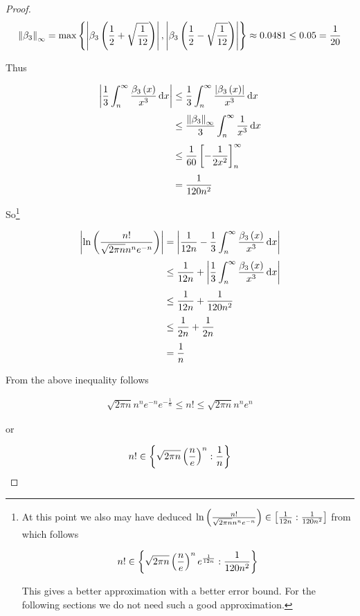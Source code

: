 \begin{proof}
  \begin{align}
    \snorm{\bps[3]} = \max\left\{\abs{\bp[3]{\frac 12 + \sqrt{\frac{1}{12}}}}, \abs{\bp[3]{\frac 12 - \sqrt{\frac{1}{12}}}}\right\} \approx 0.0481 \le 0.05 = \frac{1}{20}
  \end{align}

  \noindent Thus

  \begin{align}
    \abs{\frac 13\int_n^\infty \frac{\bp[3]{x}}{x^3} \d{x}} & \le \frac 13 \int_n^\infty \frac{\abs{\bp[3]{x}}}{x^3} \d{x} \nl
    & \le \frac{\snorm{\bps[3]}}{3} \int_n^\infty \frac 1{x^3} \d{x} \nl
    & \le \frac{1}{60} \left[-\frac{1}{2x^2}\right]_n^\infty \nl
    & = \frac 1{120n^2}
  \end{align}

  \noindent So\footnote{At this point we also may have deduced $\ln\left(\frac{n!}{\sqrt{2\pi n}n^n e^{-n}}\right) \in \an[\frac1{120n^2}]{\frac 1{12n}}$ from which follows

  \begin{align}
    n! \in \ean[\frac 1{120n^2}]{\sqrt{2\pi n} \left(\frac ne\right)^n e^{\frac 1{12n}}}
  \end{align}

  This gives a better approximation with a better error bound. For the following sections we do not need such a good approximation.

  }

  \begin{align}
    \abs{\ln\left(\frac{n!}{\sqrt{2\pi n}n^n e^{-n}}\right)} & = \abs{\frac 1{12n}-\frac 13 \int_n^\infty \frac{\bp[3]{x}}{x^3} \d{x}} \nl
    & \le \frac 1{12n} + \abs{\frac 13\int_n^\infty \frac{\bp[3]{x}}{x^3} \d{x}} \nl
    & \le \frac 1{12n} + \frac{1}{120n^2} \nl
    & \le \frac 1{2n} + \frac{1}{2n} \nl
    & = \frac{1}{n}
  \end{align}

  \noindent From the above inequality follows

  \begin{align}
    \sqrt{2\pi n}n^n e^{-n} e^{-\frac 1n} \le n! \le \sqrt{2\pi n} n^n e^n
  \end{align}

  \noindent or

  \begin{align}
    n! \in \ean[\frac 1n]{\sqrt{2\pi n} \left(\frac ne\right)^n}
  \end{align}
\end{proof}

